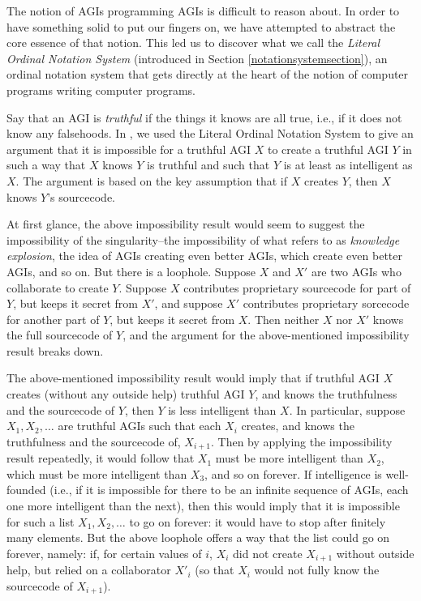 \documentclass[runningheads]{llncs}
\begin{document}
The notion of AGIs programming AGIs is difficult to reason about. In order
to have something solid to put our fingers on, we have attempted to abstract
the core essence of that notion. This led us to discover
what we call the \emph{Literal Ordinal Notation System} (introduced in Section
\ref{notationsystemsection}), an ordinal notation system that gets directly at
the heart of the notion of computer programs writing computer programs.

Say that an AGI is \emph{truthful} if the things it knows are all true,
i.e., if it does not know any falsehoods.
In \cite{alexander2019measuring}, we used the Literal Ordinal Notation System to give an
argument
that it is impossible for a truthful AGI $X$ to create a
truthful AGI $Y$ in such a way that $X$ knows $Y$ is truthful
and such that $Y$ is at least as intelligent as $X$.
The argument is based on the key assumption that if $X$ creates $Y$, then $X$
knows $Y$'s sourcecode.

At first glance, the above impossibility result would
seem to suggest the impossibility of the singularity--the impossibility of
what \cite{hutter2012} refers to as \emph{knowledge explosion}, the idea of
AGIs creating even better AGIs, which create even better AGIs, and so on.
But there is a loophole. Suppose $X$ and $X'$ are two AGIs
who collaborate to create $Y$. Suppose $X$ contributes proprietary sourcecode for
part of $Y$, but keeps it secret from $X'$, and suppose $X'$ contributes proprietary
sorcecode for another part of $Y$, but keeps it secret from $X$. Then neither
$X$ nor $X'$ knows the full sourcecode of $Y$, and the argument for the
above-mentioned impossibility result breaks down.

The above-mentioned impossibility result would imply that if truthful
AGI $X$ creates (without any outside
help) truthful AGI $Y$, and knows the truthfulness and the sourcecode of $Y$,
then $Y$ is less intelligent than $X$. In particular, suppose $X_1,X_2,\ldots$
are truthful AGIs such that each $X_i$ creates, and knows the truthfulness and
the sourcecode of, $X_{i+1}$. Then by applying the impossibility result repeatedly,
it would follow that $X_1$ must be more intelligent than $X_2$, which must be more
intelligent than $X_3$, and so on forever. If intelligence is well-founded (i.e.,
if it is impossible for there to be an infinite sequence of AGIs, each one more
intelligent than the next), then this would imply that it is impossible for such
a list $X_1,X_2,\ldots$ to go on forever: it would have to stop after finitely
many elements. But the above loophole offers a way that the list could go on
forever, namely: if, for certain values of $i$, $X_i$ did not create $X_{i+1}$
without outside help, but relied on a collaborator $X'_i$ (so that $X_i$ would
not fully know the sourcecode of $X_{i+1}$).
\end{document}
